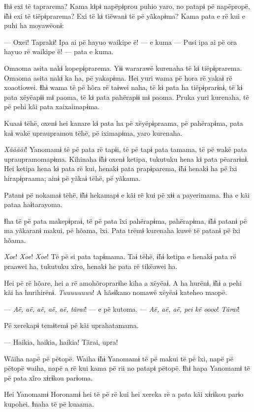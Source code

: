 Ɨhɨ exi të taprarema? Kama kɨpɨ napëpɨprou puhio yaro, no patapɨ pë
napëpropë, ɨ̃hɨ exi të tiëpɨprarema? Exi të kɨ tiëwanɨ të pë yãkapɨma?
Kama pata e rë kui e puhi ha moyawëonɨ: 

--- Oxei! Taprakɨ! Ipa ai pë hayuo waikipe ë! --- e kuma --- Pusi ipa ai pë
ora hayuo rë waikipe ë! --- pata e kuma. 

Omaoma asita nakɨ kopepɨprarema. Yɨɨ wararawë kurenaha të kɨ
 tiëpɨprarema. Omaoma asita nakɨ ka ha, pë yakapɨma. Hei yuri wama pë
 hora rë yakaɨ rë xoaotiowei. Ɨhɨ wama të pë hõra rë taɨwei naha, të kɨ
 pata ha tiëpɨprarɨnɨ, të kɨ pata xëyëapɨɨ mɨ paoma, të kɨ pata pahërapɨɨ
 mɨ paoma. Pruka yuri kurenaha, të pë pehi kãi pata xaixaimapɨma. 

Kuaaɨ tëhë, oxenɨ hei kanare kɨ pata ha pë xëyëpɨpraama, pë pahërapɨma,
 pata kaɨ wakë upraupramou tëhë, pë iximapɨma, yaro kurenaha. 

\textit{Xããããi}! Yanomamɨ të pë pata rë tapɨi, të pë tapɨ pata tamama, të pë wakë
pata upraupramomapɨma. Kihinaha ɨ̃hɨ oxenɨ ketipa, tukutuku hena kɨ pata
pëararɨnɨ. Hei ketipa hena kɨ pata rë kui, henakɨ pata prapɨparema, ɨ̃hɨ
henakɨ ha pë ĩxi hirapɨpraama; ainɨ pë yãkaɨ tëhë, pë yãkama. 

Patanɨ pë nokamaɨ tëhë, ɨ̃hɨ hekamapɨ e kãi rë kui pë xɨɨ a payerimama.
Ɨha e kãi pataa haɨtarayoma. 

Ɨha të pë pata makepɨpraɨ, të pë pata ĩxi pahërapɨma, pahërapɨma, ɨ̃hɨ
patanɨ pë ma yãkaranɨ makui, pë hõama, ĩxi. Pata trëmɨ kurenaha kuwë të
patanɨ pë ĩxi hõama. 

\textit{Xoe}! \textit{Xoe}! \textit{Xoe}! Të pë si pata tapɨmama. Taɨ tëhë, ɨ̃hɨ ketipa e henakɨ
 pata rë praawei ha, tukutuku xĩro, henakɨ he pata rë tikëawei ha. 

Hei pë rë hõare, hei a rë amohõroprarɨhe kiha a xëyëaɨ. A ha hurënɨ, ɨ̃hɨ
a pehi kãi ha hurihirënɨ. \textit{Tuuuuuuuu}! A hãsɨkano nomawë xëyëaɨ kateheo
maopë. 

--- \textit{Aë, aë, aë, aë, aë, tãrai}! --- e pë kutoma. --- \textit{Aë, aë, aë, pei kë oooo}!
\textit{Tãrai}!

Pë xerekapɨ temɨtemɨ pë kãi uprahatamama. 

--- Haikia, haikia, haikia! Tãrai, upra! 

Wãiha napë pë pëtopë. Waiha ɨ̃hɨ Yanomamɨ të pë makui të pë ĩxi, napë pë
pëtopë waiha, napë a rë kui kama pë rii no patapɨ pëtopë. Ɨhɨ hapa
Yanomamɨ të pë pata xĩro xɨrɨkou parɨoma. 

Hei Yanomamɨ Horonamɨ hei të pë rë kui hei xereka rë a pata kãi xɨrɨkou
parɨo kupohei. Ɨnaha të pë kuaama. 

